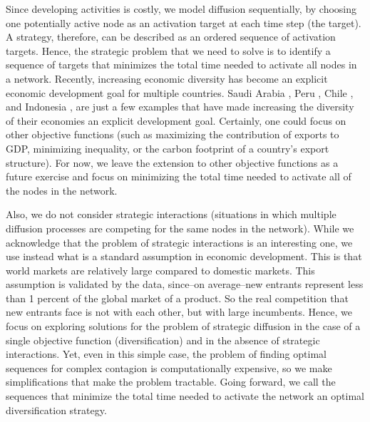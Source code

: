 \documentclass[preprint,superscriptaddress,floatfix]{article}
\begin{document}
Since developing activities is costly, we model diffusion sequentially, by choosing one potentially active node as an activation target at each time step (the target). A strategy, therefore, can be described as an ordered sequence of activation targets. Hence, the strategic problem that we need to solve is to identify a sequence of targets that minimizes the total time needed to activate all nodes in a network. Recently, increasing economic diversity has become an explicit economic development goal for multiple countries. Saudi Arabia \cite{saudivision}, Peru \cite{peruvision}, Chile \cite{chilevision}, and Indonesia \cite{indonesiavision}, are just a few examples that have made increasing the diversity of their economies an explicit development goal. Certainly, one could focus on other objective functions (such as maximizing the contribution of exports to GDP, minimizing inequality\cite{hartmann2017linking}, or the carbon footprint\cite{hamwey2013mapping} of a country's export structure). For now, we leave the extension to other objective functions as a future exercise and focus on minimizing the total time needed to activate all of the nodes in the network. 

Also, we do not consider strategic interactions (situations in which multiple diffusion processes are competing for the same nodes in the network). While we acknowledge that the problem of strategic interactions is an interesting one, we use instead what is a standard assumption in economic development. This is that world markets are relatively large compared to domestic markets. This assumption is validated by the data, since--on average--new entrants represent less than 1 percent of the global market of a product. So the real competition that new entrants face is not with each other, but with large incumbents. Hence, we focus on exploring solutions for the problem of strategic diffusion in the case of a single objective function (diversification) and in the absence of strategic interactions. Yet, even in this simple case, the problem of finding optimal sequences for complex contagion is computationally expensive, so we make simplifications that make the problem tractable. Going forward, we call the sequences that minimize the total time needed to activate the network an optimal diversification strategy. 
\end{document}
